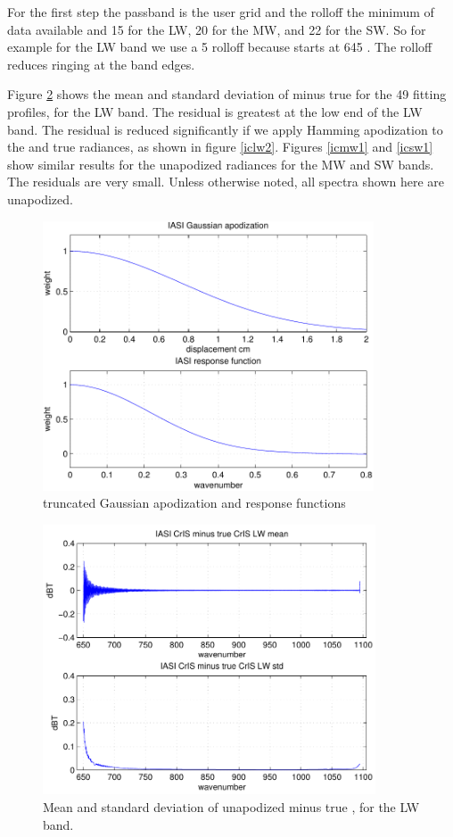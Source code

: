 \documentclass[12pt]{article}
\begin{document}
For the first step the passband is the {\cris} user grid and the
rolloff the minimum of data available and 15 {\wn} for the LW, 20
{\wn} for the MW, and 22 {\wn} for the SW.  So for example for the 
LW band we use a 5 {\wn} rolloff because {\iasi} starts at 645 {\wn}.
The rolloff reduces ringing at the band edges.

Figure \ref{iclw1} shows the mean and standard deviation of {\iasi}
{\cris} minus true {\cris} for the 49 fitting profiles, for the
{\cris} LW band.  The residual is greatest at the low end of the LW
band.  The residual is reduced significantly if we apply Hamming
apodization to the {\iasi} {\cris} and true {\cris} radiances, as
shown in figure \ref{iclw2}.  Figures \ref{icmw1} and \ref{icsw1}
show similar results for the unapodized radiances for the MW and SW
bands. The residuals are very small.  Unless otherwise noted, all
{\cris} spectra shown here are unapodized.


\begin{figure}
  \centering
  \includegraphics[height=8cm]{figures/iasi_apod_resp.pdf}
  \caption{{\iasi} truncated Gaussian apodization and response
    functions}
  \label{igauss}
\end{figure}

\begin{figure}
  \centering
  \includegraphics[height=8cm]{figures/iasi_cris_lw_1.pdf}
  \caption{Mean and standard deviation of unapodized {\iasi} {\cris}
    minus true {\cris}, for the {\cris} LW band.}
  \label{iclw1}
\end{figure}
\end{document}
